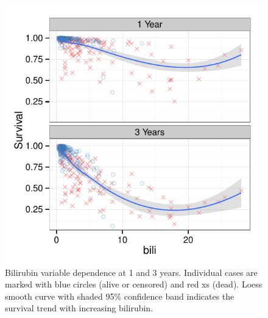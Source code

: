 \documentclass[nojss]{jss}
\begin{document}
\begin{Schunk}
\begin{figure}[!htpb]

{\centering \includegraphics[width=\maxwidth]{figure/rfs-variable-plotbili-1} 

}

\caption[Bilirubin variable dependence at 1 and 3 years]{Bilirubin variable dependence at 1 and 3 years. Individual cases are marked with blue circles (alive or censored) and red xs (dead). Loess smooth curve with shaded 95\% confidence band indicates the survival trend with increasing bilirubin.\label{fig:variable-plotbili}}
\end{figure}
\end{Schunk}
\end{document}
